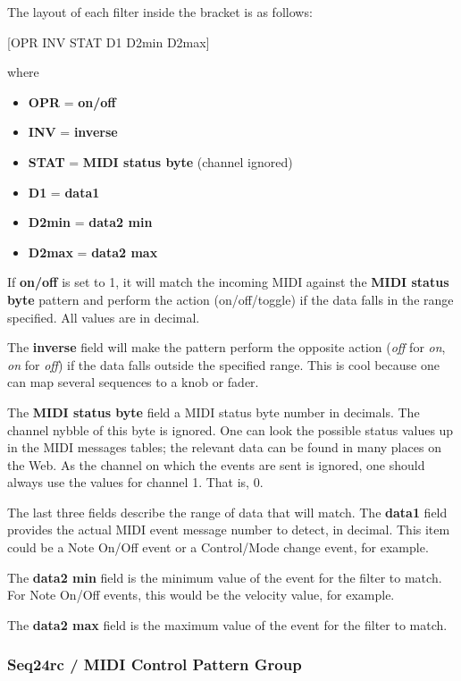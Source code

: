    The layout of each filter inside the bracket is as follows:

      [OPR INV STAT D1 D2min D2max]

   where

   \begin{itemize}
      \item \textbf{OPR} = \textbf{on/off}
      \item \textbf{INV} = \textbf{inverse}
      \item \textbf{STAT} = \textbf{MIDI status byte} (channel ignored) 
      \item \textbf{D1} = \textbf{data1}
      \item \textbf{D2min} = \textbf{data2 min}
      \item \textbf{D2max} = \textbf{data2 max}
   \end{itemize}

   If \textbf{on/off} is set to 1, it will match the incoming MIDI against
   the \textbf{MIDI status byte} pattern and perform the action
   (on/off/toggle) if the data falls in the range specified.  All values are
   in decimal.

	The \textbf{inverse} field will make the pattern perform the opposite 
   action (\textsl{off} for \textsl{on}, \textsl{on} for \textsl{off}) if
   the data falls outside the specified range.  This is cool because one can
   map several sequences to a knob or fader.

   The \textbf{MIDI status byte} field a MIDI status byte number in decimals.
   The channel nybble of this byte is ignored.
   One can look the possible status values up in the MIDI messages tables; the
   relevant data can be found in many places on the Web.
   As the channel on which the events are sent is ignored, one should
   always use the values for channel 1.  That is, 0.

	The last three fields describe the range of data that will match.
   The \textbf{data1} field provides the actual MIDI event message number to
   detect, in decimal.
   This item could be a Note On/Off event or a Control/Mode change event,
   for example.

   The \textbf{data2 min} field is the minimum value of the event
   for the filter to match. For Note On/Off events,
   this would be the velocity value, for example.

   The \textbf{data2 max} field is the maximum value of the event
   for the filter to match.

\subsubsection{Seq24rc / MIDI Control Pattern Group}
\label{subsubsec:seq24_rc_file_midi_control_pattern_group}

